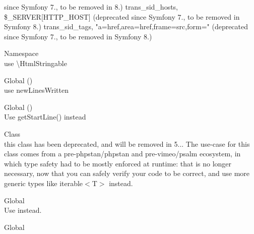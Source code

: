\begin{DoxyRefList}
since Symfony 7., to be removed in 8.) trans\+\_\+sid\+\_\+hosts, \$\+\_\+\+SERVER\mbox{[}\textquotesingle{}HTTP\+\_\+\+HOST\textquotesingle{}\mbox{]} (deprecated since Symfony 7., to be removed in Symfony 8.) trans\+\_\+sid\+\_\+tags, "{}a=href,area=href,frame=src,form="{} (deprecated since Symfony 7., to be removed in Symfony 8.)  
\item[Namespace \doxylink{namespace_nette_1_1_localization}{Nette\textbackslash{}Localization} ]\hfill \\
\label{deprecated__deprecated000234}%
%
use \textbackslash{}\+Html\+Stringable  
\item[Global \doxylink{interface_illuminate_1_1_console_1_1_contracts_1_1_new_line_aware_a8207469ed3a333ca774c9eb00a8ac6ee}{New\+Line\+Aware\+::new\+Line\+Written} ()]\hfill \\
\label{deprecated__deprecated000098}%
%
use new\+Lines\+Written  
\item[Global \doxylink{interface_php_parser_1_1_node_aef9c32f6066788a101028a1d4150f8cb}{Node\+::get\+Line} ()]\hfill \\
\label{deprecated__deprecated000259}%
%
Use get\+Start\+Line() instead  
\item[Class \doxylink{class_ramsey_1_1_uuid_1_1_provider_1_1_node_1_1_node_provider_collection}{Node\+Provider\+Collection} ]\hfill \\
\label{deprecated__deprecated000376}%
%
this class has been deprecated, and will be removed in 5... The use-\/case for this class comes from a pre-\/{\ttfamily phpstan/phpstan} and pre-\/{\ttfamily vimeo/psalm} ecosystem, in which type safety had to be mostly enforced at runtime\+: that is no longer necessary, now that you can safely verify your code to be correct, and use more generic types like {\ttfamily iterable\texorpdfstring{$<$}{<}T\texorpdfstring{$>$}{>}} instead. 
\item[Global \doxylink{class_php_parser_1_1_node_traverser_a6d11bd165a2ecd3a965f1a64df677f96}{Node\+Traverser\+::DONT\+\_\+\+TRAVERSE\+\_\+\+CHILDREN} ]\hfill \\
\label{deprecated__deprecated000268}%
%
Use  instead.  
\item[Global \doxylink{class_php_parser_1_1_node_traverser_ae5987b64591d5fb77abdcf3c51cbb238}{Node\+Traverser\+::DONT\+\_\+\+TRAVERSE\+\_\+\+CURRENT\+\_\+\+AND\+\_\+\+CHILDREN} ]\hfill \\

\end{DoxyRefList}
